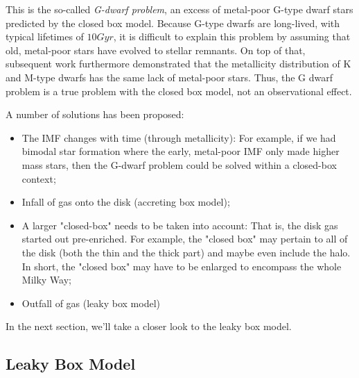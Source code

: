 \par This is the so-called \emph{G-dwarf problem}, an excess of metal-poor G-type dwarf stars predicted by the closed box model. Because G-type dwarfs are long-lived, with typical lifetimes of $10\unit{Gyr}$, it is difficult to explain this problem by assuming that old, metal-poor stars have evolved to stellar remnants. On top of that, subsequent work furthermore demonstrated that the metallicity distribution of K and M-type dwarfs has the same lack of metal-poor stars. Thus, the G dwarf problem is a true problem with the closed box model, not an observational effect.
\par A number of solutions has been proposed:
\begin{itemize}
    \item The IMF changes with time (through metallicity): For example, if we had bimodal star formation where the early, metal-poor IMF only made higher mass stars, then the G-dwarf problem could be solved within a closed-box context;
    \item Infall of gas onto the disk (accreting box model);
    \item A larger "closed-box" needs to be taken into account: That is, the disk gas started out pre-enriched. For example, the "closed box" may pertain to all of the disk (both the thin and the thick part) and maybe even include the halo. In short, the "closed box" may have to be enlarged to encompass the whole Milky Way;
    \item Outfall of gas (leaky box model)
\end{itemize}
In the next section, we'll take a closer look to the leaky box model.

\subsection{Leaky Box Model}

